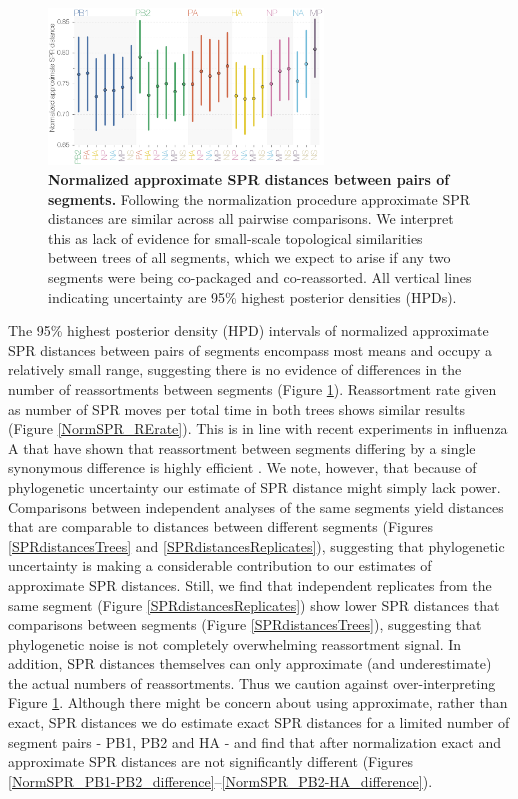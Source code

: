 \documentclass[11pt,oneside,letterpaper]{article}
\begin{document}
\begin{figure}[h]
	\centering		
	\includegraphics[width=0.65\textwidth]{supp_figures/InfB_normalizedApproxSPR.png}
	\caption{\textbf{Normalized approximate SPR distances between pairs of segments.}
Following the normalization procedure approximate SPR distances are similar across all pairwise comparisons.
We interpret this as lack of evidence for small-scale topological similarities between trees of all segments, which we expect to arise if any two segments were being co-packaged and co-reassorted.
All vertical lines indicating uncertainty are 95\% highest posterior densities (HPDs).}
	\label{SPRdistances}
\end{figure}

The 95\% highest posterior density (HPD) intervals of normalized approximate SPR distances between pairs of segments encompass most means and occupy a relatively small range, suggesting there is no evidence of differences in the number of reassortments between segments (Figure \ref{SPRdistances}).
Reassortment rate given as number of SPR moves per total time in both trees shows similar results (Figure \ref{NormSPR_RErate}).
This is in line with recent experiments in influenza A that have shown that reassortment between segments differing by a single synonymous difference is highly efficient \citep{marshall2013}.
We note, however, that because of phylogenetic uncertainty our estimate of SPR distance might simply lack power.
Comparisons between independent analyses of the same segments yield distances that are comparable to distances between different segments (Figures \ref{SPRdistancesTrees} and \ref{SPRdistancesReplicates}), suggesting that phylogenetic uncertainty is making a considerable contribution to our estimates of approximate SPR distances.
Still, we find that independent replicates from the same segment (Figure \ref{SPRdistancesReplicates}) show lower SPR distances that comparisons between segments (Figure \ref{SPRdistancesTrees}), suggesting that phylogenetic noise is not completely overwhelming reassortment signal.
In addition, SPR distances themselves can only approximate (and underestimate) the actual numbers of reassortments.
Thus we caution against over-interpreting Figure \ref{SPRdistances}.
Although there might be concern about using approximate, rather than exact, SPR distances we do estimate exact SPR distances for a limited number of segment pairs - PB1, PB2 and HA - and find that after normalization exact and approximate SPR distances are not significantly different (Figures \ref{NormSPR_PB1-PB2_difference}--\ref{NormSPR_PB2-HA_difference}).
\end{document}
